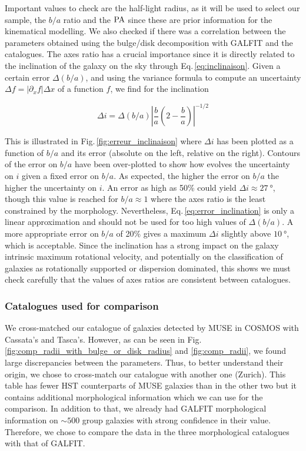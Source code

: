 Important values to check are the half-light radius, as it will be used to select our sample, the $b/a$ ratio and the $\rm{PA}$ since these are prior information for the kinematical modelling. We also checked if there was a correlation between the parameters obtained using the bulge/disk decomposition with GALFIT and the catalogues. The axes ratio has a crucial importance since it is directly related to the inclination of the galaxy on the sky through Eq.\,\ref{eq:inclinaison}. Given a certain error $\Delta (b/a)$, and using the variance formula to compute an uncertainty $\Delta f = | \partial_x f | \Delta x$ of a function $f$, we find for the inclination

\begin{equation}
	\Delta i = \Delta (b/a) \left | \frac{b}{a} \left ( 2 - \frac{b}{a} \right ) \right | ^{-1/2}
	\label{eq:error_inclination}
\end{equation}

This is illustrated in Fig.\,\ref{fig:erreur_inclinaison} where $\Delta i$ has been plotted as a function of $b/a$ and its error (absolute on the left, relative on the right). Contours of the error on $b/a$ have been over-plotted to show how evolves the uncertainty on $i$ given a fixed error on $b/a$. As expected, the higher the error on $b/a$ the higher the uncertainty on $i$. An error as high as 50\% could yield $\Delta i \approx \SI{27}{\degree}$, though this value is reached for $b/a \approx 1$ where the axes ratio is the least constrained by the morphology. Nevertheless, Eq.\,\ref{eq:error_inclination} is only a linear approximation and should not be used for too high values of $\Delta (b/a)$. A more appropriate error on $b/a$ of 20\% gives a maximum $\Delta i$ slightly above $\SI{10}{\degree}$, which is acceptable. Since the inclination has a strong impact on the galaxy intrinsic maximum rotational velocity, and potentially on the classification of galaxies as rotationally supported or dispersion dominated, this shows we must check carefully that the values of axes ratios are consistent between catalogues.

\subsubsection{Catalogues used for comparison}

We cross-matched our catalogue of galaxies detected by MUSE in COSMOS with Cassata's and Tasca's. However, as can be seen in Fig.\,\ref{fig:comp_radii_with_bulge_or_disk_radius} and \ref{fig:comp_radii}, we found large discrepancies between the parameters. Thus, to better understand their origin, we chose to cross-match our catalogue with another one (Zurich). This table has fewer HST counterparts of MUSE galaxies than in the other two but it contains additional morphological information which we can use for the comparison. In addition to that, we already had GALFIT morphological information on $\sim 500$ group galaxies with strong confidence in their value. Therefore, we chose to compare the data in the three morphological catalogues with that of GALFIT.

